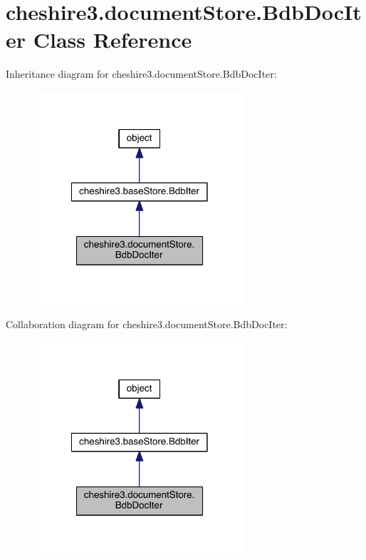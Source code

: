 \hypertarget{classcheshire3_1_1document_store_1_1_bdb_doc_iter}{\section{cheshire3.\-document\-Store.\-Bdb\-Doc\-Iter Class Reference}
\label{classcheshire3_1_1document_store_1_1_bdb_doc_iter}
}


Inheritance diagram for cheshire3.\-document\-Store.\-Bdb\-Doc\-Iter\-:
\nopagebreak
\begin{figure}[H]
\begin{center}
\leavevmode
\includegraphics[width=222pt]{classcheshire3_1_1document_store_1_1_bdb_doc_iter__inherit__graph}
\end{center}
\end{figure}


Collaboration diagram for cheshire3.\-document\-Store.\-Bdb\-Doc\-Iter\-:
\nopagebreak
\begin{figure}[H]
\begin{center}
\leavevmode
\includegraphics[width=222pt]{classcheshire3_1_1document_store_1_1_bdb_doc_iter__coll__graph}
\end{center}
\end{figure}
